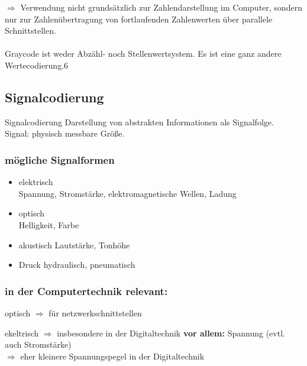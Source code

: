 \documentclass[10pt,a4paper]{scrartcl}
\begin{document}
\noindent
$\Rightarrow$ Verwendung nicht grundsätzlich zur Zahlendarstellung im Computer, sondern nur zur Zahlenübertragung von fortlaufenden Zahlenwerten über parallele Schnittstellen.\\
\\
Graycode ist weder Abzähl- noch Stellenwertsystem. Es ist eine ganz andere Wertecodierung.6

\newpage
\subsection{Signalcodierung}

\begin{Theorem}{Signalcodierung}{}
	Darstellung von abstrakten Informationen als Signalfolge. \\
	Signal: physisch messbare Größe.
\end{Theorem}

\subsubsection{mögliche Signalformen}
\begin{itemize}
	\renewcommand\labelitemi{--}
	
	\item elektrisch\\
		Spannung, Stromstärke, elektromagnetische Wellen, Ladung
	\item optisch\\
		Helligkeit, Farbe
	\item akustisch
		Lautstärke, Tonhöhe
	\item Druck
		hydraulisch, pneumatisch
\end{itemize}

\subsubsection*{in der Computertechnik relevant:}

\begin{list}{}{}
	\item[] optisch $\Rightarrow$ für netzwerkschnittstellen
	\item ekeltrisch $\Rightarrow$ insbesondere in der Digitaltechnik
	\subitem \textbf{vor allem:} Spannung (evtl. auch Stromstärke)\\
	\hspace*{2em}$\Rightarrow$ eher kleinere Spannungspegel in der Digitaltechnik
\end{list}
\end{document}

